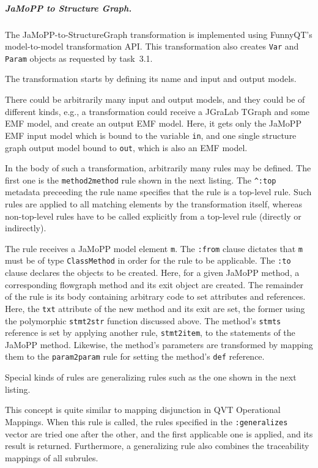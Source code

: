 \documentclass[submission]{eptcs}
\begin{document}
\subparagraph{JaMoPP to Structure Graph.}
\label{sec:jamopp-struct-graph}

The JaMoPP-to-StructureGraph transformation is implemented using FunnyQT's
model-to-model transformation API.  This transformation also creates \verb|Var|
and \verb|Param| objects as requested by task~3.1.

The transformation starts by defining its name and input and output models.



There could be arbitrarily many input and output models, and they could be of
different kinds, e.g., a transformation could receive a JGraLab TGraph and some
EMF model, and create an output EMF model.  Here, it gets only the JaMoPP EMF
input model which is bound to the variable \verb|in|, and one single structure
graph output model bound to \verb|out|, which is also an EMF model.

In the body of such a transformation, arbitrarily many rules may be defined.
The first one is the \verb|method2method| rule shown in the next listing.  The
\verb|^:top| metadata preceeding the rule name specifies that the rule is a
top-level rule.  Such rules are applied to all matching elements by the
transformation itself, whereas non-top-level rules have to be called explicitly
from a top-level rule (directly or indirectly).



The rule receives a JaMoPP model element \verb|m|.  The \verb|:from| clause
dictates that \verb|m| must be of type \verb|ClassMethod| in order for the rule
to be applicable.  The \verb|:to| clause declares the objects to be created.
Here, for a given JaMoPP method, a corresponding flowgraph method and its exit
object are created.  The remainder of the rule is its body containing arbitrary
code to set attributes and references.  Here, the \verb|txt| attribute of the
new method and its exit are set, the former using the polymorphic
\verb|stmt2str| function discussed above.  The method's \verb|stmts| reference
is set by applying another rule, \verb|stmt2item|, to the statements of the
JaMoPP method.  Likewise, the method's parameters are transformed by mapping
them to the \verb|param2param| rule for setting the method's \verb|def|
reference.

Special kinds of rules are generalizing rules such as the one shown in the next
listing.



This concept is quite similar to mapping disjunction in QVT Operational
Mappings.  When this rule is called, the rules specified in the
\verb|:generalizes| vector are tried one after the other, and the first
applicable one is applied, and its result is returned.  Furthermore, a
generalizing rule also combines the traceability mappings of all subrules.
\end{document}
